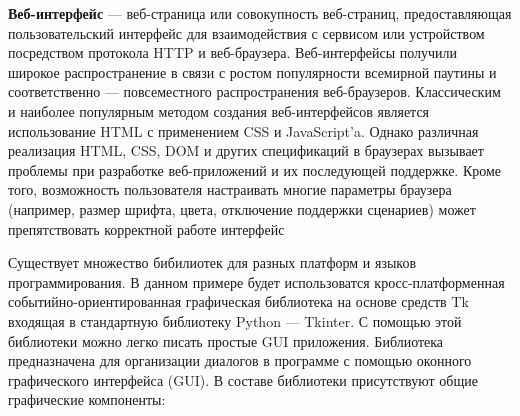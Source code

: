 \documentclass[a4paper]{article}
\begin{document}
\textbf{Веб-интерфейс} --- веб-страница или совокупность веб-страниц, предоставляющая пользовательский интерфейс для взаимодействия с сервисом или устройством посредством протокола HTTP и веб-браузера. Веб-интерфейсы получили широкое распространение в связи с ростом популярности всемирной паутины и соответственно — повсеместного распространения веб-браузеров. Классическим и наиболее популярным методом создания веб-интерфейсов является использование HTML с применением CSS и JavaScript'a. Однако различная реализация HTML, CSS, DOM и других спецификаций в браузерах вызывает проблемы при разработке веб-приложений и их последующей поддержке. Кроме того, возможность пользователя настраивать многие параметры браузера (например, размер шрифта, цвета, отключение поддержки сценариев) может препятствовать корректной работе интерфейс

Существует множество бибилиотек для разных платформ и языков программирования. В данном примере будет использоватся кросс-платформенная событийно-ориентированная графическая библиотека на основе средств Tk входящая в стандартную библиотеку Python --- Tkinter. С помощью этой библиотеки можно легко писать простые GUI приложения.
Библиотека предназначена для организации диалогов в программе с помощью оконного графического интерфейса (GUI). В составе библиотеки присутствуют общие графические компоненты:
\end{document}
